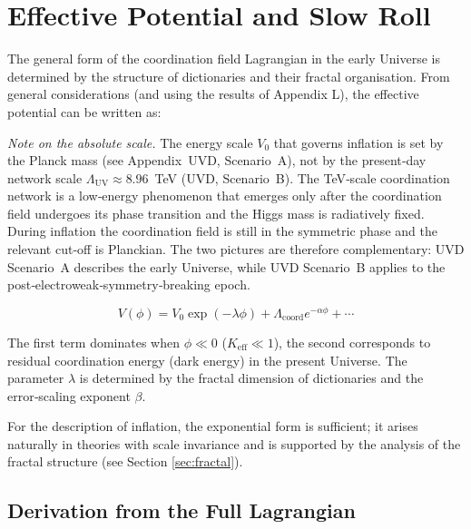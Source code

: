 \documentclass[12pt]{article}
\theoremstyle{remark}
\newcommand{\Keff}{K_{\mathrm{eff}}}
\begin{document}
	\section{Effective Potential and Slow Roll}
	\label{sec:potential}
	
	The general form of the coordination field Lagrangian in the early Universe is determined by the structure of dictionaries and their fractal organisation. From general considerations (and using the results of Appendix L), the effective potential can be written as:
	
	\noindent\textit{Note on the absolute scale.}
	The energy scale $V_0$ that governs inflation is set by the Planck mass
	(see Appendix~UVD, Scenario~A), not by the present‑day network scale
	$\Lambda_{\mathrm{UV}} \approx 8.96$~TeV (UVD, Scenario~B).  The
	TeV‑scale coordination network is a low‑energy phenomenon that emerges
	only after the coordination field undergoes its phase transition and the
	Higgs mass is radiatively fixed.  During inflation the coordination
	field is still in the symmetric phase and the relevant cut‑off is
	Planckian.  The two pictures are therefore complementary: UVD Scenario~A
	describes the early Universe, while UVD Scenario~B applies to the
	post‑electroweak‑symmetry‑breaking epoch.
	
	\begin{equation}
		V(\phi) = V_0 \exp\left( -\lambda \phi \right) + \Lambda_{\mathrm{coord}} e^{-\alpha \phi} + \cdots
		\label{eq:potential}
	\end{equation}
	
	The first term dominates when $\phi \ll 0$ ($\Keff \ll 1$), the second corresponds to residual coordination energy (dark energy) in the present Universe. The parameter $\lambda$ is determined by the fractal dimension of dictionaries and the error‑scaling exponent $\beta$.
	
	For the description of inflation, the exponential form is sufficient; it arises naturally in theories with scale invariance and is supported by the analysis of the fractal structure (see Section \ref{sec:fractal}).
	
	\subsection{Derivation from the Full Lagrangian}
	
\end{document}
